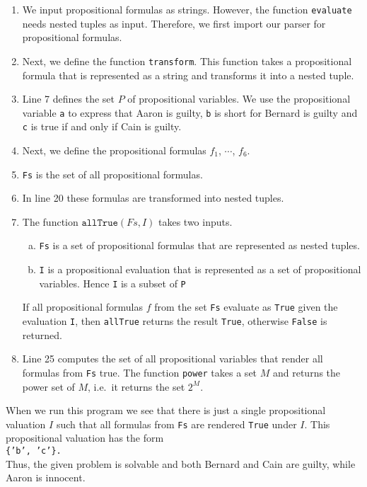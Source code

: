 \begin{enumerate}
\item We input propositional formulas as strings.  However, the function \texttt{evaluate} needs nested tuples
      as input.  Therefore, we first import our parser for propositional formulas.
\item Next, we define the function \texttt{transform}.  This function takes a propositional formula that is
      represented as a string and transforms it into a nested tuple.
\item Line 7 defines the set $P$ of propositional variables.  We use the propositional variable \texttt{a} to
      express that Aaron is guilty, \texttt{b} is short for Bernard is guilty and \texttt{c} is true if and
      only if Cain is guilty. 
\item Next, we define the propositional formulas $f_1$, $\cdots$, $f_6$.
\item \texttt{Fs} is the set of all propositional formulas.
\item In line 20 these formulas are transformed into nested tuples.
\item The function $\texttt{allTrue}(Fs, I)$ takes two inputs.
      \begin{enumerate}[(a)]
      \item \texttt{Fs} is a set of propositional formulas that are represented as nested tuples.
      \item \texttt{I} is a propositional evaluation that is represented as a set of propositional variables.
            Hence \texttt{I} is a subset of \texttt{P}
      \end{enumerate}
      If all propositional formulas $f$ from the set \texttt{Fs} evaluate as \texttt{True} given the evaluation
      \texttt{I}, then \texttt{allTrue} returns the result \texttt{True}, otherwise \texttt{False} is returned.
\item Line 25 computes the set of all propositional variables that render all formulas from \texttt{Fs} true.
      The function \texttt{power} takes a set $M$ and returns the power set of $M$, i.e.~it returns the set $2^M$.
\end{enumerate}
When we run this program we see that there is just a single propositional valuation $I$ such that all formulas
from \texttt{Fs} are rendered \texttt{True} under $I$.  This propositional valuation has the form
\\[0.2cm]
\hspace*{1.3cm}
\texttt{\{'b', 'c'\}.}
\\[0.2cm]
Thus, the given problem is solvable and both Bernard and Cain are guilty, while Aaron is innocent.

